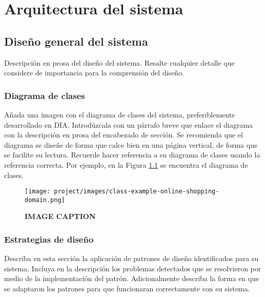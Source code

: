 \chapter{Arquitectura del sistema}
\section{Diseño general del sistema}

Descripción en prosa del diseño del sistema. Resalte cualquier detalle que considere de importancia para la comprensión del diseño.

\subsection{Diagrama de clases}
Añada una imagen con el diagrama de clases del sistema,  preferiblemente desarrollado en DIA. Introdúzcala con un párrafo breve que enlace el diagrama con la descripción en prosa del encabezado de sección. Se recomienda que el diagrama se diseñe de forma que calce bien en una página vertical, de forma que se facilite su lectura. Recuerde hacer referencia a su diagrama de clases usando la referencia correcta. Por ejemplo, en la Figura \ref{DiagramaClases} se encuentra el diagrama de clases.
\begin{figure}[H]
  \centering
    \texttt{[image: project/images/class-example-online-shopping-domain.png]}
  \caption{\textbf{IMAGE CAPTION}}
  \label{DiagramaClases}
\end{figure}

\subsection{Estrategias de diseño}
Describa en esta sección la aplicación de patrones de diseño identificados para su sistema. Incluya en la descripción los problemas detectados que se resolvieron por medio de la implementación del patrón. Adicionalmente describa la forma en que se adaptaron los patrones para que funcionaran correctamente con su sistema.

